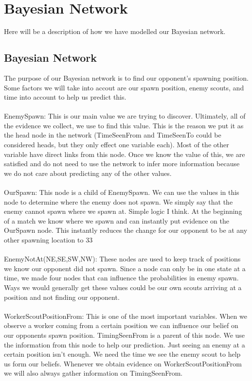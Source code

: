 \section{Bayesian Network}\label{bayesian_network}

Here will be a description of how we have modelled our Bayesian network.

\subsection*{Bayesian Network}			 
			
The purpose of our Bayesian network is to find our opponent's spawning position. Some factors we will take into accout are our spawn position, enemy scouts, and time into account to help us predict this.
\\
\\
EnemySpawn: This is our main value we are trying to discover. Ultimately, all of the evidence we collect, we use to find this value. This is the reason we put it as the head node in the network (TimeSeenFrom and TimeSeenTo could be considered heads, but they only effect one variable each). Most of the other variable have direct links from this node. Once we know the value of this, we are satisfied and do not need to use the network to infer more information because we do not care about predicting any of the other values.
\\
\\
OurSpawn: This node is a child of EnemySpawn. We can use the values in this node to determine where the enemy does not spawn. We simply say that the enemy cannot spawn where we spawn at. Simple logic I think. At the beginning of a match we know where we spawn and can instantly put evidence on the OurSpawn node. This instantly reduces the change for our opponent to be at any other spawning location to 33%
\\
\\
EnemyNotAt(NE,SE,SW,NW): These nodes are used to keep track of positions we know our opponent did not spawn. Since a node can only be in one state at a time, we made four nodes that can influence the probabilities in enemy spawn. Ways we would generally get these values could be our own scouts arriving at a position and not finding our opponent.
\\
\\
WorkerScoutPositionFrom: This is one of the most important variables. When we observe a worker coming from a certain position we can influence our belief on our opponents spawn position. TimingSeenFrom is a parent of this node. We use the information from this node to help our prediction. Just seeing an enemy at a certain position isn't enough. We need the time we see the enemy scout to help us form our beliefs. Whenever we obtain evidence on WorkerScoutPositionFrom we will also always gather information on TimingSeenFrom.

